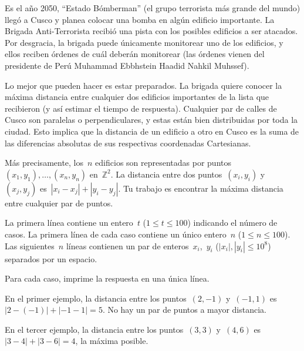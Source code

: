 
Es el año 2050, ``Estado Bómberman'' (el grupo terrorista más grande del mundo) llegó
a Cusco y planea colocar una bomba en algún edificio importante. La Brigada
Anti-Terrorista recibió una pista con los posibles edificios a ser atacados. Por
desgracia, la brigada puede únicamente monitorear uno de los edificios, y ellos
reciben órdenes de cuál deberán monitorear (las órdenes vienen del presidente de Perú
Muhammad Ebbhstein Haadid Nahkil Muhssef).

Lo mejor que pueden hacer es estar preparados. La brigada quiere conocer la máxima
distancia entre cualquier dos edificios importantes de la lista que recibieron (y así
estimar el tiempo de respuesta). Cualquier par de calles de Cusco son paralelas o
perpendiculares, y estas están bien distribuidas por toda la ciudad. Esto implica que
la distancia de un edificio a otro en Cusco es la suma de las diferencias absolutas
de sus respectivas coordenadas Cartesianas.

Más precisamente, los~$n$ edificios son representadas por
puntos~$(x_1, y_1), \dots, (x_n, y_n)$ en~$\mathbb{Z}^2$. La distancia entre dos
puntos~$(x_i, y_i)$ y~$(x_j, y_j)$ es~$|x_i - x_j| + |y_i - y_j|$. Tu trabajo es
encontrar la máxima distancia entre cualquier par de puntos.



La primera línea contiene un entero~$t$ ($1 \leq t \leq 100$) indicando el número de
casos. La primera línea de cada caso contiene un único entero~$n$
($1 \leq n \leq 100$). Las siguientes~$n$ líneas contienen un par de
enteros~$x_i$,~$y_i$ ($|x_i|, |y_i| \leq 10^8$) separados por un espacio.

\outputText

Para cada caso, imprime la respuesta en una única línea.

\exampleCases

\begin{example}
\end{example}

\explanationText

En el primer ejemplo, la distancia entre los puntos~$(2, -1)$ y~$(-1, 1)$
es~$|2 - (- 1)| + |-1 - 1| = 5$. No hay un par de puntos a mayor distancia.

En el tercer ejemplo, la distancia entre los puntos~$(3, 3)$ y~$(4, 6)$
es~$|3 - 4| + |3 - 6| = 4$, la máxima posible.
